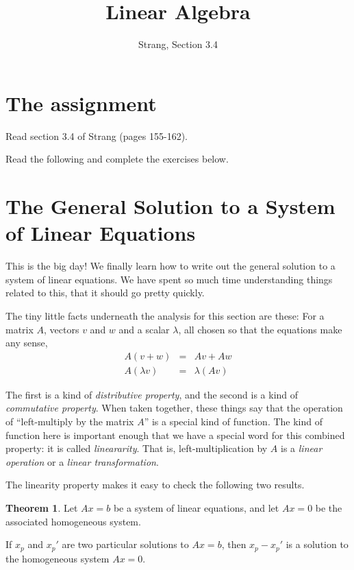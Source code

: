 \documentclass[11pt]{amsart}
\theoremstyle{definition}
\newtheorem*{theorem}{Theorem}
\begin{document}
\title{Linear Algebra}
\author{Strang, Section 3.4}
\maketitle

\section{The assignment}
\begin{compactitem}
\item Read section 3.4 of Strang (pages 155-162).
\item Read the following and complete the exercises below.
\end{compactitem}


\section{The General Solution to a System of Linear Equations}

This is the big day! We finally learn how to write out the general solution to a system of linear equations. We have spent so much time understanding things related to this, that it should go pretty quickly.

The tiny little facts underneath the analysis for this section are these:
For a matrix $A$, vectors $v$ and $w$ and a scalar $\lambda$, all chosen so that the equations make any sense,
\[
\begin{array}{rcl}
A(v+w) & = & Av + Aw \\
A(\lambda v) & = & \lambda ( Av )
\end{array}
\]

The first is a kind of \emph{distributive property}, and the second is a kind of \emph{commutative property}. When taken together, these things say that the operation of ``left-multiply by the matrix $A$'' is a special kind of function. The kind of function here is important enough that we have a special word for this combined property: it is called \emph{lineararity}. That is, left-multiplication by $A$ is a \emph{linear operation} or a \emph{linear transformation}.

The linearity property makes it easy to check the following two results.
\begin{theorem}
Let $Ax=b$ be a system of linear equations, and let $Ax=0$ be the associated homogeneous system.

If $x_p$ and $x_p'$ are two particular solutions to $Ax=b$, then $x_p - x_p'$ is a solution to the homogeneous system $Ax=0$.
\end{theorem}
\end{document}

